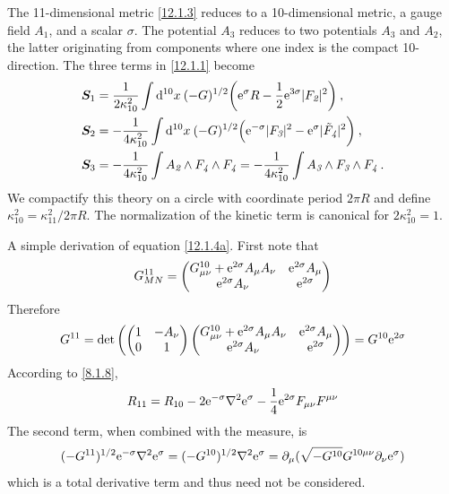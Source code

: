 The 11-dimensional metric \eqref{12.1.3} reduces to a 10-dimensional metric, a gauge field $A_{\textit{1}}$, and a scalar $\sigma$. The potential $A_{\textit{3}}$ reduces to two potentials $A_{\textit{3}}$ and $A_{\textit{2}}$, the latter originating from components where one index is the compact 10-direction. The three terms in \eqref{12.1.1} become
\begin{subequations} \label{12.1.4}
	\begin{align}
		\bm{S}_{1} &=\frac{1}{2\kappa_{10}^{2}}\int \mathrm{d}^{10}x\:(-G)^{1/2}\biggl(\mathrm{e}^{\sigma}R-\frac{1}{2}\mathrm{e}^{3\sigma}\lvert F_{\textit{2}}\rvert^{2}\biggr) \:, \label{12.1.4a} \\
		\bm{S}_{2} &=-\frac{1}{4\kappa_{10}^{2}}\int \mathrm{d}^{10}x\:(-G)^{1/2}\Bigl(\mathrm{e}^{-\sigma}\lvert F_{\textit{3}}\rvert^{2}-\mathrm{e}^{\sigma}\lvert \tilde{F}_{\textit{4}}\rvert^{2}\biggr) \:, \label{12.1.4b} \\
		\bm{S}_{3} &= - \frac{1}{4\kappa_{10}^{2}}\int A_{\textit{2}}\wedge  F_{\textit{4}} \wedge F_{\textit{4}}
		= - \frac{1}{4\kappa_{10}^{2}}\int A_{\textit{3}}\wedge  F_{\textit{3}} \wedge F_{\textit{4}} \:. \label{12.1.4c}
	\end{align}  
\end{subequations}
We compactify this theory on a circle with coordinate period $2\pi R$ and define $\kappa_{10}^{2}=\kappa_{11}^{2}/2\pi R$. The normalization of the kinetic term is canonical for $2\kappa_{10}^{2}=1$.

\begin{tcolorbox}[breakable]
	A simple derivation of equation \eqref{12.1.4a}. First note that
	\[
	G_{MN}^{11}=\begin{pmatrix}
		G_{\mu\nu}^{10}+\mathrm{e}^{2\sigma} A_{\mu}A_{\nu} & \mathrm{e}^{2\sigma}A_{\mu} \\
		\mathrm{e}^{2\sigma} A_{\nu} &\mathrm{e}^{2\sigma}
	\end{pmatrix}    
	\]
	Therefore
	\[
	G^{11}=\operatorname{det} \left(\begin{pmatrix}
		1 & -A_{\nu} \\
		0 & 1
	\end{pmatrix}    \begin{pmatrix}
		G_{\mu\nu}^{10}+\mathrm{e}^{2\sigma} A_{\mu}A_{\nu} & \mathrm{e}^{2\sigma}A_{\mu} \\
		\mathrm{e}^{2\sigma} A_{\nu} &\mathrm{e}^{2\sigma}
	\end{pmatrix}    \right)   = G^{10} \mathrm{e}^{2\sigma}
	\]
	According to \eqref{8.1.8},
	\[
	R_{11}=R_{10}-2\mathrm{e}^{-\sigma} \nabla^{2} \mathrm{e}^{\sigma} -\frac{1}{4}\mathrm{e}^{2\sigma}F_{\mu\nu}F^{\mu\nu}  
	\]
	The second term, when combined with the measure, is
	\[ 
	(-G^{11})^{1/2}\mathrm{e}^{-\sigma} \nabla^{2} \mathrm{e}^{\sigma}=(-G^{10})^{1/2}\nabla^{2}\mathrm{e}^{\sigma}=\partial_{\mu}(\sqrt{-G^{10}}G^{10\mu\nu}\partial_{\nu}\mathrm{e}^{\sigma})
	\]    
	which is a total derivative term and thus need not be considered.
\end{tcolorbox}

